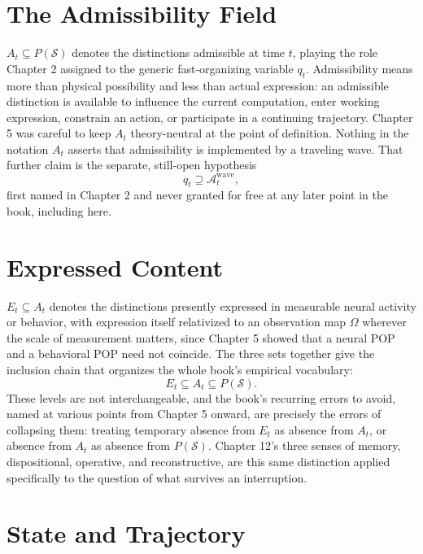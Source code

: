 \documentclass[11pt]{book}
\begin{document}
\section*{The Admissibility Field}

$A_t\subseteq P(\mathcal S)$ denotes the distinctions admissible at time $t$, playing the role Chapter 2 assigned to the generic fast-organizing variable $q_t$. Admissibility means more than physical possibility and less than actual expression: an admissible distinction is available to influence the current computation, enter working expression, constrain an action, or participate in a continuing trajectory. Chapter 5 was careful to keep $A_t$ theory-neutral at the point of definition. Nothing in the notation $A_t$ asserts that admissibility is implemented by a traveling wave. That further claim is the separate, still-open hypothesis
\[
q_t\supseteq\mathcal A_t^{\mathrm{wave}},
\]
first named in Chapter 2 and never granted for free at any later point in the book, including here.

\section*{Expressed Content}

$E_t\subseteq A_t$ denotes the distinctions presently expressed in measurable neural activity or behavior, with expression itself relativized to an observation map $\Omega$ wherever the scale of measurement matters, since Chapter 5 showed that a neural POP and a behavioral POP need not coincide. The three sets together give the inclusion chain that organizes the whole book's empirical vocabulary:
\[
E_t\subseteq A_t\subseteq P(\mathcal S).
\]
These levels are not interchangeable, and the book's recurring errors to avoid, named at various points from Chapter 5 onward, are precisely the errors of collapsing them: treating temporary absence from $E_t$ as absence from $A_t$, or absence from $A_t$ as absence from $P(\mathcal S)$. Chapter 12's three senses of memory, dispositional, operative, and reconstructive, are this same distinction applied specifically to the question of what survives an interruption.

\section*{State and Trajectory}
\end{document}
